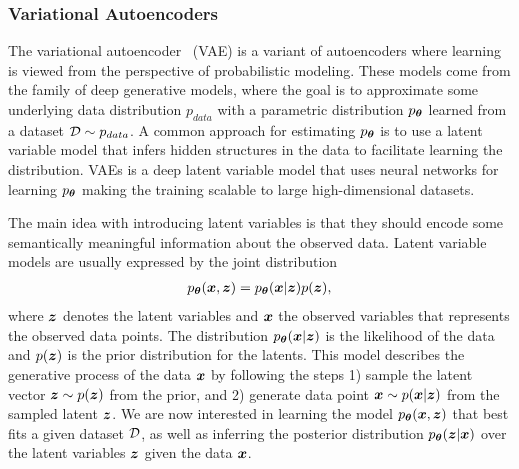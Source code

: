 \subsubsection{Variational Autoencoders}

The variational autoencoder~\cite{kingma2013auto} (VAE) is a variant of autoencoders where learning is viewed from the perspective of probabilistic modeling. These models come from the family of deep generative models, where the goal is to approximate some underlying data distribution $p_{data}$ with a parametric distribution $p_{{\bm{\theta}}}$ learned from a dataset ${\mathcal{D}} \sim p_{data}$. A common approach for estimating $p_{{\bm{\theta}}}$ is to use a latent variable model that infers hidden structures in the data to facilitate learning the distribution. VAEs is a deep latent variable model that uses neural networks for learning $p_{{\bm{\theta}}}$ making the training scalable to large high-dimensional datasets. 

The main idea with introducing latent variables is that they should encode some semantically meaningful information about the observed data. Latent variable models are usually expressed by the joint distribution 
\begin{align}
	p_{{\bm{\theta}}}({\bm{x}}, {\bm{z}}) = p_{{\bm{\theta}}}({\bm{x}} | {\bm{z}}) p({\bm{z}}),
\end{align}
where ${\bm{z}}$ denotes the latent variables and ${\bm{x}}$ the observed variables that represents the observed data points. The distribution $p_{{\bm{\theta}}}({\bm{x}} | {\bm{z}})$ is the likelihood of the data and $p({\bm{z}})$ is the prior distribution for the latents. This model describes the generative process of the data ${\bm{x}}$ by following the steps 1) sample the latent vector ${\bm{z}} \sim p({\bm{z}})$ from the prior, and 2) generate data point ${\bm{x}} \sim p({\bm{x}} | {\bm{z}})$ from the sampled latent ${\bm{z}}$. We are now interested in learning the model $p_{{\bm{\theta}}}({\bm{x}}, {\bm{z}})$ that best fits a given dataset ${\mathcal{D}}$, as well as inferring the posterior distribution $p_{{\bm{\theta}}}({\bm{z}} | {\bm{x}})$ over the latent variables ${\bm{z}}$ given the data ${\bm{x}}$.

